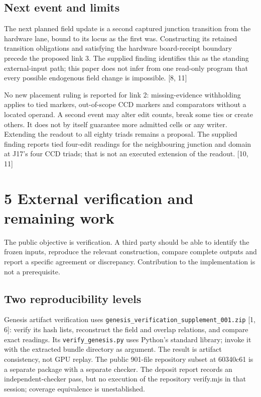 \documentclass[
]{article}
\begin{document}
\subsection{Next event and limits}\label{next-event-and-limits}

The next planned field update is a second captured junction transition
from the hardware lane, bound to its locus as the first was.
Constructing its retained transition obligations and satisfying the
hardware board-receipt boundary precede the proposed link 3. The
supplied finding identifies this as the standing external-input path;
this paper does not infer from one read-only program that every possible
endogenous field change is impossible. {[}8, 11{]}

No new placement ruling is reported for link 2: missing-evidence
withholding applies to tied markers, out-of-scope CCD markers and
comparators without a located operand. A second event may alter edit
counts, break some ties or create others. It does not by itself
guarantee more admitted cells or any writer. Extending the readout to
all eighty triads remains a proposal. The supplied finding reports tied
four-edit readings for the neighbouring junction and domain at J17's
four CCD triads; that is not an executed extension of the readout.
{[}10, 11{]}

\section{5 External verification and remaining
work}\label{external-verification-and-remaining-work}

The public objective is verification. A third party should be able to
identify the frozen inputs, reproduce the relevant construction, compare
complete outputs and report a specific agreement or discrepancy.
Contribution to the implementation is not a prerequisite.

\subsection{Two reproducibility
levels}\label{two-reproducibility-levels}

Genesis artifact verification uses
\nolinkurl{genesis_verification_supplement_001.zip} {[}1, 6{]}: verify
its hash lists, reconstruct the field and overlap relations, and compare
exact readings. Its \nolinkurl{verify_genesis.py} uses Python's standard
library; invoke it with the extracted bundle directory as argument. The
result is artifact consistency, not GPU replay. The public 901-file
repository subset at 60340c61 is a separate package with a separate
checker. The deposit report records an independent-checker pass, but no
execution of the repository verify.mjs in that session; coverage
equivalence is unestablished.
\end{document}

